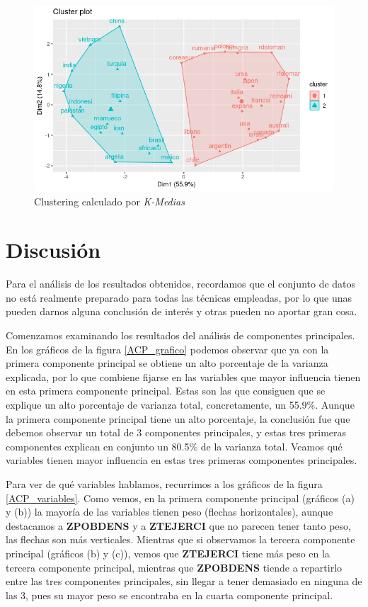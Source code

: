\documentclass[letterpaper,11pt]{article}
\begin{document}
\begin{figure}[h]
\begin{center}
\includegraphics[scale=0.7]{./img/clustering.png}
\end{center}
\caption{Clustering calculado por \textit{K-Medias}}
\label{clustering}
\end{figure}

\section{Discusión}

Para el análisis de los resultados obtenidos, recordamos que el conjunto de datos no está realmente preparado para todas las técnicas empleadas, por lo que unas pueden darnos alguna conclusión de interés y otras pueden no aportar gran cosa.

Comenzamos examinando los resultados del análisis de componentes principales. En los gráficos de la figura \ref{ACP_grafico} podemos observar que ya con la primera componente principal se obtiene un alto porcentaje de la varianza explicada, por lo que combiene fijarse en las variables que mayor influencia tienen en esta primera componente principal. Estas son las que consiguen que se explique un alto porcentaje de varianza total, concretamente, un 55.9\%. Aunque la primera componente principal tiene un alto porcentaje, la conclusión fue que debemos observar un total de 3 componentes principales, y estas tres primeras componentes explican en conjunto un 80.5\% de la varianza total. Veamos qué variables tienen mayor influencia en estas tres primeras componentes principales.

Para ver de qué variables hablamos, recurrimos a los gráficos de la figura \ref{ACP_variables}. Como vemos, en la primera componente principal (gráficos (a) y (b)) la mayoría de las variables tienen peso (flechas horizontales), aunque destacamos a \textbf{ZPOBDENS} y a \textbf{ZTEJERCI} que no parecen tener tanto peso, las flechas son más verticales. Mientras que si observamos la tercera componente principal (gráficos (b) y (c)), vemos que \textbf{ZTEJERCI} tiene más peso en la tercera componente principal, mientras que \textbf{ZPOBDENS} tiende a repartirlo entre las tres componentes principales, sin llegar a tener demasiado en ninguna de las 3, pues su mayor peso se encontraba en la cuarta componente principal.
\end{document}
